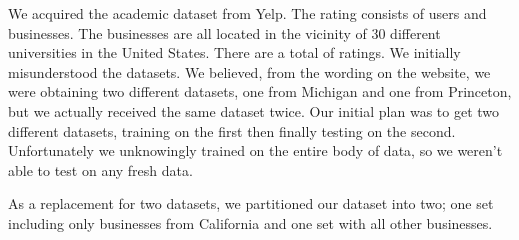
We acquired the academic dataset from Yelp\cite{yelp}. The rating consists of
\numUserTotal users and \numBusTotal businesses. The businesses are all located
in the vicinity of $30$ different universities in the United States. There are
a total of \numRatingTotal ratings. We initially misunderstood the datasets. We
believed, from the wording on the website, we were obtaining two different
datasets, one from Michigan and one from Princeton, but we actually received
the same dataset twice. Our initial plan was to get two different datasets,
training on the first then finally testing on the second. Unfortunately we
unknowingly trained on the entire body of data, so we weren't able to test on
any fresh data. 

As a replacement for two datasets, we partitioned our dataset into two; one set
including only businesses from California and one set with all other
businesses. 


